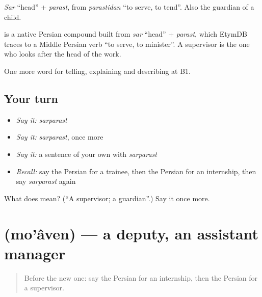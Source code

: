 \emph{Sar} \textquotedblleft{}head\textquotedblright{} + \emph{parast}, from \emph{parastidan} \textquotedblleft{}to serve, to tend\textquotedblright{}. Also the guardian of a child.

\begin{cousinweb}
\textbf{} is a native Persian compound built from \emph{sar} \textquotedblleft{}head\textquotedblright{} + \emph{parast}, which EtymDB traces to a Middle Persian verb \textquotedblleft{}to serve, to minister\textquotedblright{}. A supervisor is the one who looks after the head of the work.
\end{cousinweb}

\begin{grammarlens}[title={What you've built}]
One more word for telling, explaining and describing at B1.
\end{grammarlens}

\subsection*{Your turn}
\begin{itemize}
\raggedright
  \item \emph{Say it:} \emph{sarparast}
  \item \emph{Say it:} \emph{sarparast}, once more
  \item \emph{Say it:} a sentence of your own with \emph{sarparast}
  \item \emph{Recall:} say the Persian for a trainee, then the Persian for an internship, then say \emph{sarparast} again
\end{itemize}

\begin{tcolorbox}[breakable,colback=teal!4,colframe=teal!35!black,title={Before you move on}]
What does  mean? (\textquotedblleft{}A supervisor; a guardian\textquotedblright{}.) Say it once more.
\end{tcolorbox}
\section[\texorpdfstring{\fa{معاون} (mo'âven)}{معاون (mo'âven)}]{ (mo'âven) — a deputy, an assistant manager}

\label{lesson:FA-C381-moaven}



\begin{quote}
Before the new one: say the Persian for an internship, then the Persian for a supervisor.
\end{quote}

